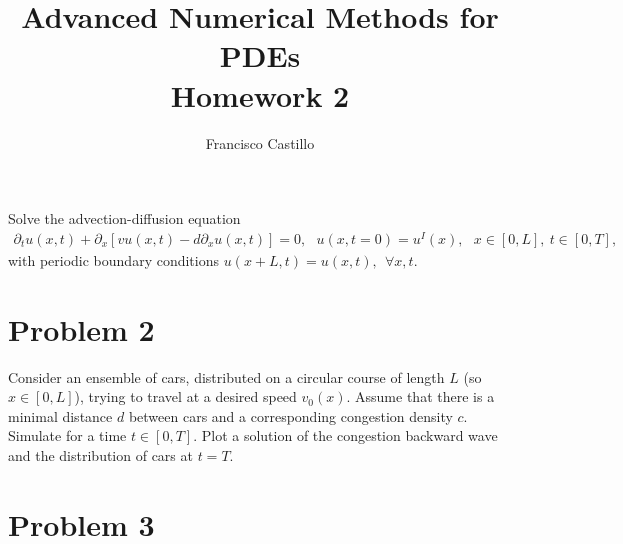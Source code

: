 \documentclass[12pt,answers]{exam}
\begin{document}
 
 
 
\title{\textbf{Advanced Numerical Methods for PDEs}\\ \Large{Homework 2}}%
\author{Francisco Castillo}
 

\maketitle
Solve the advection-diffusion equation
\begin{align}\label{eq:PDE}
\partial_tu(x,t)+\partial_x\left[vu(x,t)-d\partial_xu(x,t)\right]=0,~~~
u(x,t=0)=u^I(x),~~~
x\in[0, L],~
t\in[0, T],
\end{align}
with periodic boundary conditions $u(x + L, t) = u(x, t),~~ \forall x, t$.

%
\section*{Problem 2}

\newpage

Consider an ensemble of cars, distributed on a circular course of length $L$ (so $x\in[0, L]$), trying to travel at a desired speed $v_0(x)$. Assume that there is a minimal distance $d$ between cars and a corresponding congestion density $c$. Simulate for a time $t\in[0,T]$.
Plot a solution of the congestion backward wave and the
distribution of cars at $t = T$.

\section*{Problem 3}

%
%
\end{document}
